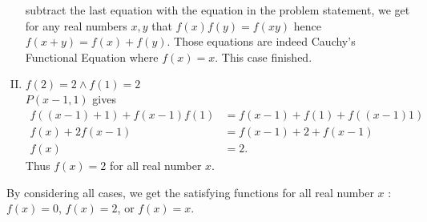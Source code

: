 \begin{solusi}
\begin{enumerate}[I.]
        subtract the last equation with the equation in the problem statement, we get for any real numbers $x,y$ that $f(x)f(y)=f(xy)$ hence $f(x+y)=f(x)+f(y)$. Those equations are indeed Cauchy's Functional Equation where $f(x)=x$. This case finished.


        \item $f(2)=2 \wedge f(1)=2$\\
        $P(x-1,1)$ gives
        \begin{align*}
            f((x-1)+1) + f(x-1)f(1) &= f(x-1)+f(1)+f((x-1)1)\\
            f(x) + 2f(x-1) &= f(x-1)+2+f(x-1)\\
            f(x) &= 2.
        \end{align*}
        Thus $f(x)=2$ for all real number $x$.
    \end{enumerate}
    By considering all cases, we get the satisfying functions for all real number $x$ : $f(x)=0$, $f(x)=2$, or $f(x)=x$.
\end{solusi}